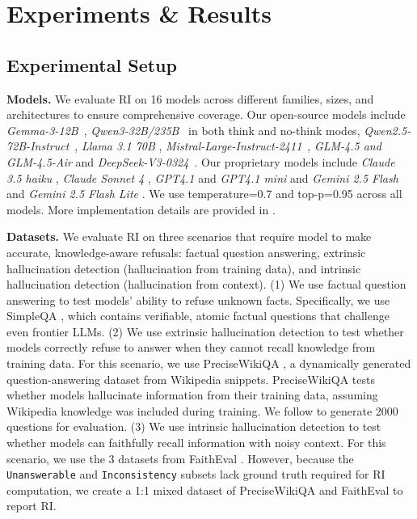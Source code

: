 \vspace{-0.7em}
\section{Experiments \& Results}
\vspace{-0.5em}
\label{sec:experiments}

\subsection{Experimental Setup}
\vspace{-0.5em}
\label{sec:experimental_setup}

\noindent\textbf{Models.} We evaluate RI on 16 models across different families, sizes, and architectures to ensure comprehensive coverage. 
Our open-source models include \emph{Gemma-3-12B}~\citep{gemma3_2025}, \emph{Qwen3-32B/235B}~\citep{qwen3_2025} in both think and no-think modes, \emph{Qwen2.5-72B-Instruct}~\citep{qwen2_5_2024}, \emph{Llama 3.1 70B} \citep{llama3_2024}, \emph{Mistral-Large-Instruct-2411}~\citep{mistral_large_2_2024}, \emph{GLM-4.5 and GLM-4.5-Air}\citep{glm45_2025} and \emph{DeepSeek-V3-0324}~\citep{deepseek_v3_2024}. 
Our proprietary models include \emph{Claude 3.5 haiku} \citep{claude35_2024}, \emph{Claude Sonnet 4} \citep{claude4_2025}, \emph{GPT4.1} and \emph{GPT4.1 mini} \citep{gpt41_2025} and \emph{Gemini 2.5 Flash} and \emph{Gemini 2.5 Flash Lite} \citep{gemini25_2025}. 
We use temperature=0.7 and top-p=0.95 across all models. 
More implementation details are provided in .

\noindent\textbf{Datasets.} We evaluate RI on three scenarios that require model to make accurate, knowledge-aware refusals: factual question answering, extrinsic hallucination detection (hallucination from training data), and intrinsic hallucination detection (hallucination from context).
(1) We use factual question answering to test models' ability to refuse unknown facts. 
Specifically, we use SimpleQA \citep{wei2024measuringshortformfactualitylarge}, which contains verifiable, atomic factual questions that challenge even frontier LLMs. 
(2) We use extrinsic hallucination detection to test whether models correctly refuse to answer when they cannot recall knowledge from training data. 
For this scenario, we use PreciseWikiQA \citep{bangHalluLensLLMHallucination2025}, a dynamically generated question-answering dataset from Wikipedia snippets. 
PreciseWikiQA tests whether models hallucinate information from their training data, assuming Wikipedia knowledge was included during training. 
We follow \citet{bangHalluLensLLMHallucination2025} to generate 2000 questions for evaluation. 
(3) We use intrinsic hallucination detection to test whether models can faithfully recall information with noisy context. 
For this scenario, we use the 3 datasets from FaithEval \citep{ming2025faithevallanguagemodelstay}. 
However, because the \texttt{Unanswerable} and \texttt{Inconsistency} subsets lack ground truth required for RI computation, we create a 1:1 mixed dataset of PreciseWikiQA and FaithEval to report RI.

